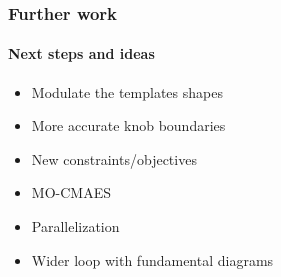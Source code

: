 \documentclass[fleqn]{beamer}
\begin{document}
\begin{frame}
	\frametitle{Further work}
	\framesubtitle{Next steps and ideas}
	\begin{itemize}
		\item Modulate the templates shapes
		\item More accurate knob boundaries
		\item New constraints/objectives
		\item MO-CMAES
		\item Parallelization
		\item Wider loop with fundamental diagrams
	\end{itemize}
\end{frame}
\end{document}
